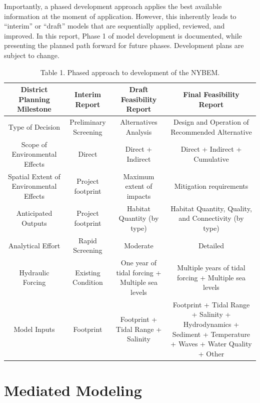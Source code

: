 \documentclass[
]{book}
\begin{document}
Importantly, a phased development approach applies the best available information at the moment of application. However, this inherently leads to ``interim'' or ``draft'' models that are sequentially applied, reviewed, and improved. In this report, Phase 1 of model development is documented, while presenting the planned path forward for future phases. Development plans are subject to change.

\begin{table}

\caption{\label{tab:unnamed-chunk-2}Table 1. Phased approach to development of the NYBEM.}
\centering
\begin{tabular}[t]{c|c|c|c}
\hline
District Planning Milestone & Interim Report & Draft Feasibility Report & Final Feasibility Report\\
\hline
Type of Decision & Preliminary Screening & Alternatives Analysis & Design and Operation of Recommended Alternative\\
\hline
Scope of Environmental Effects & Direct & Direct + Indirect & Direct + Indirect + Cumulative\\
\hline
Spatial Extent of Environmental Effects & Project footprint & Maximum extent of impacts & Mitigation requirements\\
\hline
Anticipated Outputs & Project footprint & Habitat Quantity (by type) & Habitat Quantity, Quality, and Connectivity (by type)\\
\hline
Analytical Effort & Rapid Screening & Moderate & Detailed\\
\hline
Hydraulic Forcing & Existing Condition & One year of tidal forcing + Multiple sea levels & Multiple years of tidal forcing + Multiple sea levels\\
\hline
Model Inputs & Footprint & Footprint + Tidal Range + Salinity & Footprint + Tidal Range + Salinity + Hydrodynamics + Sediment + Temperature + Waves + Water Quality + Other\\
\hline
\end{tabular}
\end{table}

\hypertarget{mediated-modeling}{%
\section{Mediated Modeling}\label{mediated-modeling}}
\end{document}
